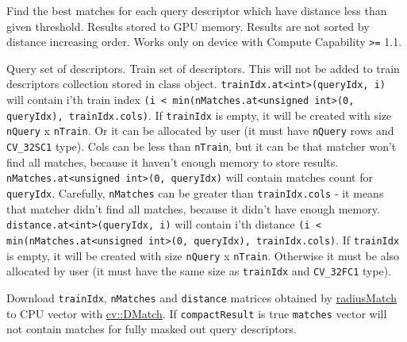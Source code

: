 \label{cppfunc.gpu.BruteForceMatcher.radiusMatchSingle}
Find the best matches for each query descriptor which have distance less than given threshold. Results stored to GPU memory. Results are not sorted by distance increasing order. Works only on device with Compute Capability \texttt{>=} 1.1.
\begin{description}
 {Query set of descriptors.}
 {Train set of descriptors. This will not be added to train descriptors collection stored in class object.}
 {\texttt{trainIdx.at<int>(queryIdx, i)} will contain i'th train index \newline\texttt{(i < min(nMatches.at<unsigned int>(0, queryIdx), trainIdx.cols)}. If \texttt{trainIdx} is empty, it will be created with size \texttt{nQuery} x \texttt{nTrain}. Or it can be allocated by user (it must have \texttt{nQuery} rows and \texttt{CV\_32SC1} type). Cols can be less than \texttt{nTrain}, but it can be that matcher won't find all matches, because it haven't enough memory to store results.}
 {\texttt{nMatches.at<unsigned int>(0, queryIdx)} will contain matches count for \texttt{queryIdx}. Carefully, \texttt{nMatches} can be greater than \texttt{trainIdx.cols} - it means that matcher didn't find all matches, because it didn't have enough memory.}
 {\texttt{distance.at<int>(queryIdx, i)} will contain i'th distance \newline\texttt{(i < min(nMatches.at<unsigned int>(0, queryIdx), trainIdx.cols)}. If \texttt{trainIdx} is empty, it will be created with size \texttt{nQuery} x \texttt{nTrain}. Otherwise it must be also allocated by user (it must have the same size as \texttt{trainIdx} and \texttt{CV\_32FC1} type).}
\end{description}

\label{cppfunc.gpu.BruteForceMatcher.radiusMatchDownload}
Download \texttt{trainIdx}, \texttt{nMatches} and \texttt{distance} matrices obtained by \hyperref[cppfunc.gpu.BruteForceMatcher.radiusMatchSingle]{radiusMatch} to CPU vector with \hyperref[cv.class.DMatch]{cv::DMatch}. If \texttt{compactResult} is true \texttt{matches} vector will not contain matches for fully masked out query descriptors.

